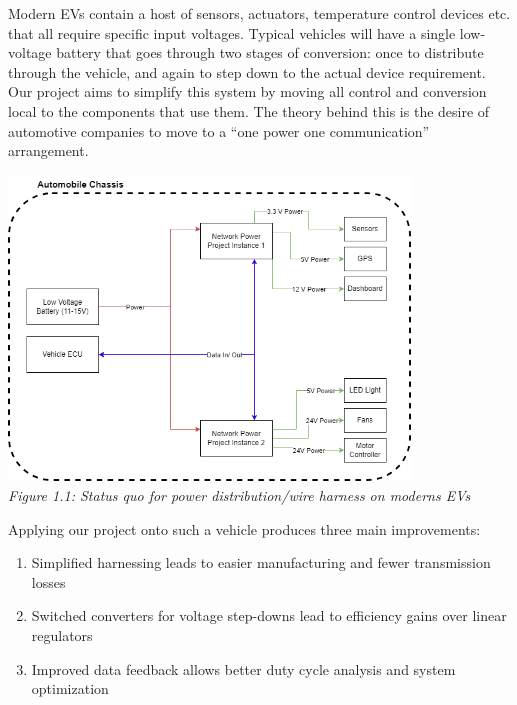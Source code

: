 Modern EVs contain a host of sensors, actuators, temperature control devices etc. that all require specific input voltages.
Typical vehicles will have a single low-voltage battery that goes through two stages of conversion: once to distribute through the vehicle, and again to step down to the actual device requirement.
Our project aims to simplify this system by moving all control and conversion local to the components that use them.
The theory behind this is the desire of automotive companies to move to a “one power one communication” arrangement.

\begin{center}
    \includegraphics[width=0.8\textwidth]{./images/new_status_diagram.png}\\
    \textit{Figure 1.1: Status quo for power distribution/wire harness on moderns EVs}\\
\end{center}
\vspace{\baselineskip}

Applying our project onto such a vehicle produces three main improvements:
\begin{enumerate}
    \item Simplified harnessing leads to easier manufacturing and fewer transmission losses
    \item Switched converters for voltage step-downs lead to efficiency gains over linear regulators
    \item Improved data feedback allows better duty cycle analysis and system optimization
\end{enumerate}

